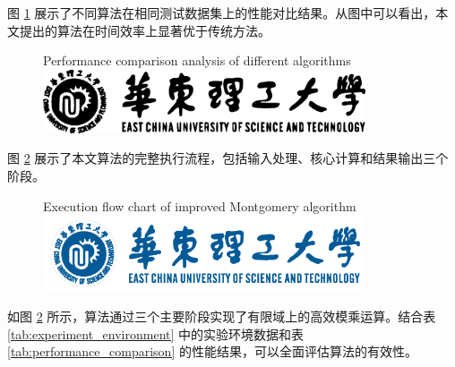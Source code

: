 图 \ref{fig:performance_comparison} 展示了不同算法在相同测试数据集上的性能对比结果。从图中可以看出，本文提出的算法在时间效率上显著优于传统方法。

\begin{figure}[htbp]
	\centering
	{Performance comparison analysis of different algorithms} %
	\label{fig:performance_comparison} %
	\includegraphics[width=0.85\textwidth]{figures/figure2.eps} %
\end{figure}

图 \ref{fig:algorithm_flow} 展示了本文算法的完整执行流程，包括输入处理、核心计算和结果输出三个阶段。

\begin{figure}[H] %
	\centering
	{Execution flow chart of improved Montgomery algorithm} %
	\label{fig:algorithm_flow} %
	\includegraphics[width=0.85\textwidth]{figures/ECUST-logo.png} %
	\end{figure}
	
如图 \ref{fig:algorithm_flow} 所示，算法通过三个主要阶段实现了有限域上的高效模乘运算。结合表 \ref{tab:experiment_environment} 中的实验环境数据和表 \ref{tab:performance_comparison} 的性能结果，可以全面评估算法的有效性。

